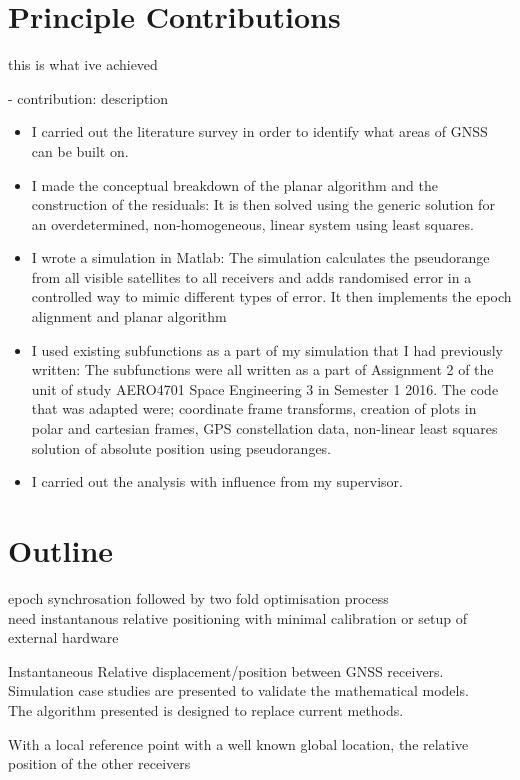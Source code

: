 \section{Principle Contributions}
this is what ive achieved
 
- contribution: description
\begin{itemize}
\item I carried out the literature survey in order to identify what areas of GNSS can be built on.
\item I made the conceptual breakdown of the planar algorithm and the construction of the residuals: It is then solved using the generic solution for an overdetermined, non-homogeneous, linear system using least squares.
\item I wrote a simulation in Matlab: The simulation calculates the pseudorange from all visible satellites to all receivers and adds randomised error in a controlled way to mimic different types of error. It then implements the epoch alignment and planar algorithm  
\item I used existing subfunctions as a part of my simulation that I had previously written: The subfunctions were all written as a part of Assignment 2 of the unit of study AERO4701 Space Engineering 3 in Semester 1 2016. The code that was adapted were; coordinate frame transforms, creation of plots in polar and cartesian frames, GPS constellation data, non-linear least squares solution of absolute position using pseudoranges.
\item I carried out the analysis with influence from my supervisor.
\end{itemize}
\section{Outline}

epoch synchrosation followed by two fold optimisation process\\
need instantanous relative positioning with minimal calibration or setup of external hardware

Instantaneous Relative displacement/position between GNSS receivers.\\
Simulation case studies are presented to validate the mathematical models.\\

The algorithm presented is designed to replace current methods.

With a local reference point with a well known global location, the relative position of the other receivers 